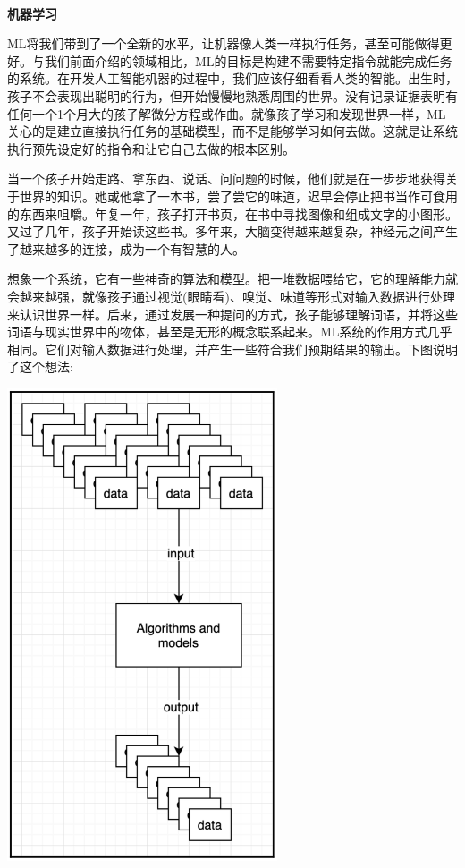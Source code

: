 \noindent\textbf{}\ \par
\textbf{机器学习} \ \par
ML将我们带到了一个全新的水平，让机器像人类一样执行任务，甚至可能做得更好。与我们前面介绍的领域相比，ML的目标是构建不需要特定指令就能完成任务的系统。在开发人工智能机器的过程中，我们应该仔细看看人类的智能。出生时，孩子不会表现出聪明的行为，但开始慢慢地熟悉周围的世界。没有记录证据表明有任何一个1个月大的孩子解微分方程或作曲。就像孩子学习和发现世界一样，ML关心的是建立直接执行任务的基础模型，而不是能够学习如何去做。这就是让系统执行预先设定好的指令和让它自己去做的根本区别。 \par
当一个孩子开始走路、拿东西、说话、问问题的时候，他们就是在一步步地获得关于世界的知识。她或他拿了一本书，尝了尝它的味道，迟早会停止把书当作可食用的东西来咀嚼。年复一年，孩子打开书页，在书中寻找图像和组成文字的小图形。又过了几年，孩子开始读这些书。多年来，大脑变得越来越复杂，神经元之间产生了越来越多的连接，成为一个有智慧的人。 \par
想象一个系统，它有一些神奇的算法和模型。把一堆数据喂给它，它的理解能力就会越来越强，就像孩子通过视觉(眼睛看)、嗅觉、味道等形式对输入数据进行处理来认识世界一样。后来，通过发展一种提问的方式，孩子能够理解词语，并将这些词语与现实世界中的物体，甚至是无形的概念联系起来。ML系统的作用方式几乎相同。它们对输入数据进行处理，并产生一些符合我们预期结果的输出。下图说明了这个想法: \par

\begin{center}
	\includegraphics[width=0.6\textwidth]{content/Section-3/Chapter-15/5}
\end{center}

